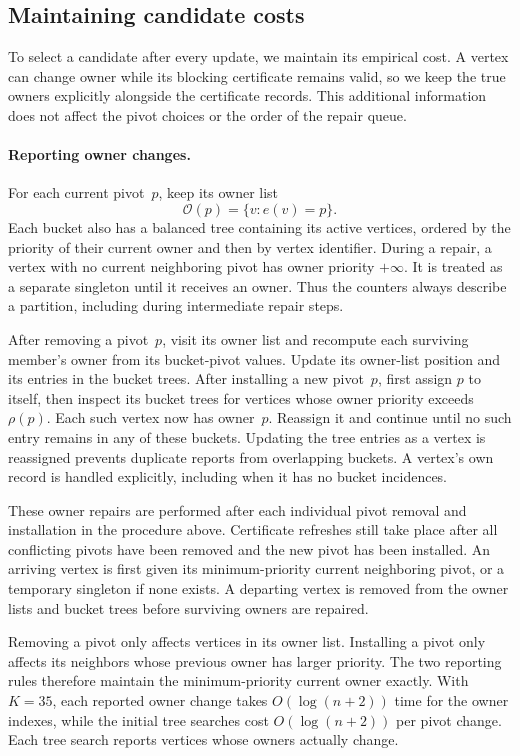 \documentclass[11pt,letterpaper]{article}
\theoremstyle{definition}
\theoremstyle{remark}
\newcommand{\1}{\mathbf{1}}
\begin{document}
\subsection{Maintaining candidate costs}
\label{sec:dynamic-scores}

To select a candidate after every update, we maintain its empirical cost.  A vertex can change owner while its blocking certificate remains valid, so we keep the true owners explicitly alongside the certificate records.  This additional information does not affect the pivot choices or the order of the repair queue.

\paragraph{Reporting owner changes.}
For each current pivot~$p$, keep its owner list
\[
 \mathcal O(p)=\{v:e(v)=p\}.
\]
Each bucket also has a balanced tree containing its active vertices, ordered by the priority of their current owner and then by vertex identifier.  During a repair, a vertex with no current neighboring pivot has owner priority $+\infty$.  It is treated as a separate singleton until it receives an owner.  Thus the counters always describe a partition, including during intermediate repair steps.

After removing a pivot~$p$, visit its owner list and recompute each surviving member's owner from its bucket-pivot values.  Update its owner-list position and its entries in the bucket trees.  After installing a new pivot~$p$, first assign $p$ to itself, then inspect its bucket trees for vertices whose owner priority exceeds~$\rho(p)$.  Each such vertex now has owner~$p$.  Reassign it and continue until no such entry remains in any of these buckets.  Updating the tree entries as a vertex is reassigned prevents duplicate reports from overlapping buckets.  A vertex's own record is handled explicitly, including when it has no bucket incidences.

These owner repairs are performed after each individual pivot removal and installation in the procedure above.  Certificate refreshes still take place after all conflicting pivots have been removed and the new pivot has been installed.  An arriving vertex is first given its minimum-priority current neighboring pivot, or a temporary singleton if none exists.  A departing vertex is removed from the owner lists and bucket trees before surviving owners are repaired.

Removing a pivot only affects vertices in its owner list.  Installing a pivot only affects its neighbors whose previous owner has larger priority.  The two reporting rules therefore maintain the minimum-priority current owner exactly.  With $K=35$, each reported owner change takes $O(\log(n+2))$ time for the owner indexes, while the initial tree searches cost $O(\log(n+2))$ per pivot change.  Each tree search reports vertices whose owners actually change.
\end{document}
